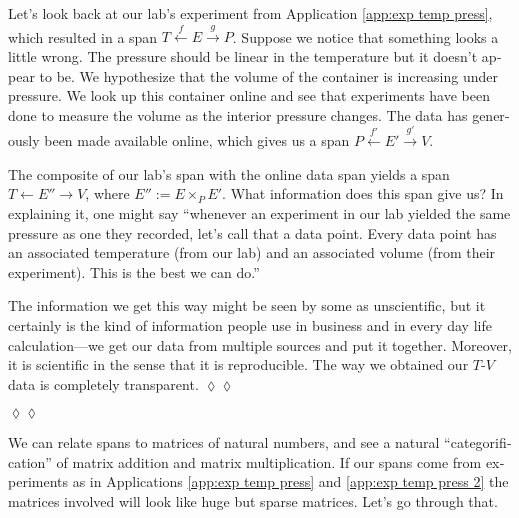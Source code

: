 \documentclass[a4paper]{book}
\def\to{\rightarrow}
\def\from{\leftarrow}
\newcommand{\To}[1]{\xrightarrow{#1}}
\newcommand{\From}[1]{\xleftarrow{#1}}
\theoremstyle{myth}
\newtheorem{appENG}[envENG]{\begin{english}Application\end{english}}
\newenvironment{applicationENG}{\begin{appENG}}{\hspace*{\fill}$\lozenge\lozenge$\end{appENG}}
\newtheorem{appRUS}[envRUS]{\begin{russian}Прикладной пример (применение)\end{russian}}
\newtheorem{definitionRUS}[envRUS]{\begin{russian}Определение\end{russian}}
\newenvironment{applicationRUS}{\begin{appRUS}}{\hspace*{\fill}$\lozenge\lozenge$\end{appRUS}}
\begin{document}
\begin{english}
\begin{definitionRUS}\label{def:composite span}
\begin{russian} \end{russian}
\end{definitionRUS}

\begin{applicationENG}\label{app:exp temp press 2}
Let's look back at our lab's experiment from Application \ref{app:exp temp press}, which resulted in a span $T\From{f}E\To{g}P$. Suppose we notice that something looks a little wrong. The pressure should be linear in the temperature but it doesn't appear to be. We hypothesize that the volume of the container is increasing under pressure. We look up this container online and see that experiments have been done to measure the volume as the interior pressure changes. The data has generously been made available online, which gives us a span $P\From{f'}E'\To{g'}V$. 

The composite of our lab's span with the online data span yields a span $T\from E''\to V$, where $E'':=E\times_PE'$. What information does this span give us? In explaining it, one might say “whenever an experiment in our lab yielded the same pressure as one they recorded, let's call that a data point. Every data point has an associated temperature (from our lab) and an associated volume (from their experiment). This is the best we can do.” 

The information we get this way might be seen by some as unscientific, but it certainly is the kind of information people use in business and in every day life calculation---we get our data from multiple sources and put it together. Moreover, it is scientific in the sense that it is reproducible. The way we obtained our $T$-$V$ data is completely transparent.
\end{applicationENG}

\begin{applicationRUS}\label{app:exp temp press 2}
\begin{russian} \end{russian}
\end{applicationRUS}

We can relate spans to matrices of natural numbers, and see a natural “categorification” of matrix addition and matrix multiplication. If our spans come from experiments as in Applications \ref{app:exp temp press} and \ref{app:exp temp press 2} the matrices involved will look like huge but sparse matrices. Let's go through that.


\end{english}
\end{document}

